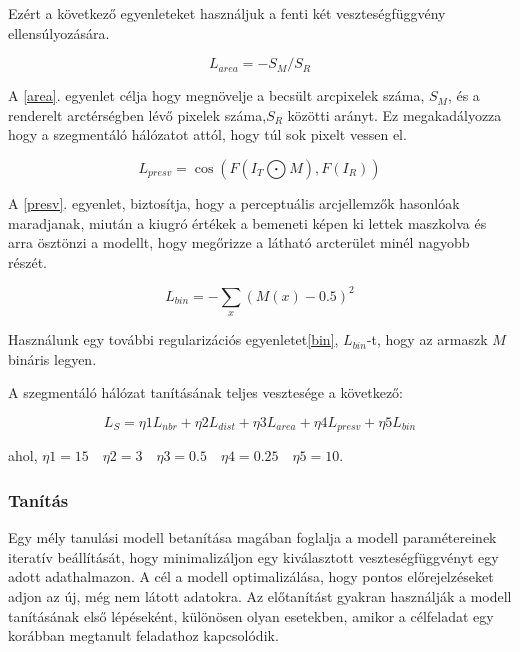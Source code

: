 \documentclass[12pt,a4]{article}
\begin{document}
            Ezért a következő egyenleteket használjuk a fenti két veszteségfüggvény ellensúlyozására.
                
            \begin{equation} \label{area}
                L_{area} = -S_{M}/S_{R}
            \end{equation}

            A \ref{area}. egyenlet célja hogy megnövelje a becsült arcpixelek száma, $S_{M}$, és a renderelt arctérségben lévő pixelek száma,$S_{R}$ közötti arányt. Ez megakadályozza hogy a szegmentáló hálózatot attól, hogy túl sok pixelt vessen el.
                
            \begin{equation} \label{presv}
                L_{presv} = \cos(F(I_{T} \bigodot M),F(I_{R}))
            \end{equation}

            A \ref{presv}. egyenlet, biztosítja, hogy a perceptuális
            arcjellemzők hasonlóak maradjanak, miután a kiugró értékek a bemeneti képen ki lettek maszkolva és arra ösztönzi a modellt, hogy megőrizze a látható arcterület minél nagyobb részét.

            \begin{equation} \label{bin}
                L_{bin} = -\sum\limits_{x}(M(x) - 0.5)^2
            \end{equation}

            Használunk egy további regularizációs egyenletet\ref{bin}, $L_{bin}$-t, hogy az armaszk $M$ bináris legyen.

            A szegmentáló hálózat tanításának teljes vesztesége a következő:

            \begin{equation}
                L_{S} = \eta{1}L_{nbr} + \eta{2}L_{dist} + \eta{3}L_{area} + \eta{4}L_{presv} + \eta{5}L_{bin}
            \end{equation}

            ahol, $\eta{1} = 15 \quad \eta{2} = 3 \quad \eta{3} = 0.5 \quad \eta{4} = 0.25 \quad \eta{5} = 10$.
            
    \subsubsection{Tanítás}
        Egy mély tanulási modell betanítása magában foglalja a modell paramétereinek iteratív beállítását, hogy minimalizáljon egy kiválasztott veszteségfüggvényt egy adott adathalmazon. A cél a modell optimalizálása, hogy pontos előrejelzéseket adjon az új, még nem látott adatokra. Az előtanítást gyakran használják a modell tanításának első lépéseként, különösen olyan esetekben, amikor a célfeladat egy korábban megtanult feladathoz kapcsolódik.
\end{document}
